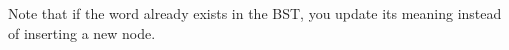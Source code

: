 \documentclass[preview]{standalone}
\begin{document}
Note that if the word already exists in the BST, you update its meaning instead of inserting a new node.\\
\end{document}
